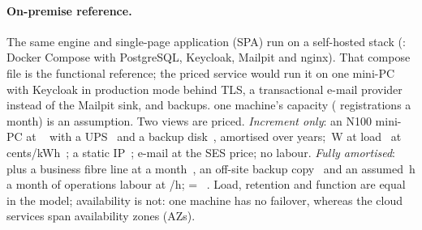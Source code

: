 \paragraph{On-premise reference.}
The same engine and single-page application (SPA) run on a self-hosted stack
(: Docker Compose with PostgreSQL, Keycloak, Mailpit and nginx). That compose
file is the functional reference; the priced service would run it on one mini-PC with Keycloak in
production mode behind TLS, a transactional e-mail provider instead of the Mailpit sink, and backups.
 one machine's capacity
(\CostOnpremCapacityRegs{} registrations a month) is an assumption. Two views are
priced. \emph{Increment only}: an N100 mini-PC at \sd\CostOnpremServerPriceSgd~\cite{onprem-newegg}
with a UPS~\cite{onprem-ups} and a backup disk~\cite{onprem-disk}, amortised over
\CostAmortisationYears{} years; \CostOnpremLoadWatts\,W at load~\cite{onprem-notebookcheck} at
\CostOnpremTariffCents{} cents/kWh~\cite{onprem-sp-tariff}; a static IP~\cite{onprem-static-ip};
e-mail at the SES price; no labour. \emph{Fully amortised}: plus a business fibre line at
\sd\CostOnpremLineSgd{} a month~\cite{onprem-m1-fibre}, an off-site backup copy~\cite{onprem-b2} and
an assumed \CostOnpremLabourHours{}\,h a month of operations labour at
\sd\CostOnpremLabourRateSgd/h; \sd\CostFxSgdPerUsd{} = ~\cite{onprem-fx}. Load, retention and
function are equal in the model; availability is not: one machine has no failover, whereas the
cloud services span availability zones (AZs).

